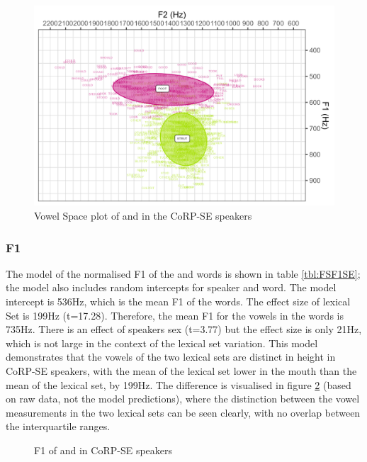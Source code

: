 \documentclass[../../../00.FullDoc/tex/ThesisSkeleton-draft2]{subfiles}
\begin{document}
\begin{figure}[h]
	\centering
	\includegraphics[width=\textwidth]{../figures/FS-SE-vplot.png}
	\caption{Vowel Space plot of \foot{} and \strutt{} in the CoRP-SE speakers} \label{fig:FSvplotSE}
\end{figure}

\subsubsection{F1} \label{subsubsec:SEF1}
The model of the normalised F1 of the \foot{}  and \strutt{}  words is shown in table \ref{tbl:FSF1SE}; the model also includes random intercepts for speaker and word. The model intercept is 536Hz, which is the mean F1 of the \foot{} words. The effect size of lexical Set is 199Hz (t=17.28). Therefore, the mean F1 for the vowels in the \strutt{} words is 735Hz. There is an effect of speakers sex (t=3.77) but the effect size is only 21Hz, which is not large in the context of the lexical set variation. This model demonstrates that the vowels of the two lexical sets are distinct in height in CoRP-SE speakers, with the mean of the \strutt{} lexical set lower in the mouth than the mean of the \foot{} lexical set, by 199Hz. The difference is visualised in figure \ref{fig:FSF1SE} (based on raw data, not the model predictions), where the distinction between the vowel measurements in the two lexical sets can be seen clearly, with no overlap between the interquartile ranges.



\begin{figure}[h]
	\centering
	
	\caption{F1 of \foot{} and \strutt{} in CoRP-SE speakers} \label{fig:FSF1SE}
\end{figure}
\end{document}
